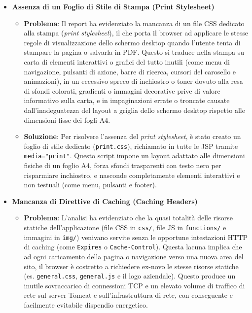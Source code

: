 \begin{itemize}
\begin{itemize}
        \item \textbf{Soluzione}: Per prevenire il download di risorse nascoste, è stato implementato il caricamento differito per le immagini fuori schermo o non immediatamente visibili. Nel carosello, l'attributo \texttt{src} è stato sostituito con \texttt{data-src}, iniettato dinamicamente via JavaScript solo all'attivazione della slide; nella pagina del catalogo, è stato aggiunto l'attributo nativo \texttt{loading="lazy"} sulle immagini dei prodotti, ritardandone il download fino allo scroll effettivo dell'utente.
    \end{itemize}
    \item \textbf{Assenza di un Foglio di Stile di Stampa (Print Stylesheet)}
    \begin{itemize}
        \item \textbf{Problema}: Il report ha evidenziato la mancanza di un file CSS dedicato alla stampa (\textit{print stylesheet}), il che porta il browser ad applicare le stesse regole di visualizzazione dello schermo desktop quando l'utente tenta di stampare la pagina o salvarla in PDF. Questo si traduce nella stampa su carta di elementi interattivi o grafici del tutto inutili (come menu di navigazione, pulsanti di azione, barre di ricerca, cursori del carosello e animazioni), in un eccessivo spreco di inchiostro o toner dovuto alla resa di sfondi colorati, gradienti o immagini decorative prive di valore informativo sulla carta, e in impaginazioni errate o troncate causate dall'inadeguatezza del layout a griglia dello schermo desktop rispetto alle dimensioni fisse dei fogli A4.
        \item \textbf{Soluzione}: Per risolvere l'assenza del \textit{print stylesheet}, è stato creato un foglio di stile dedicato (\texttt{print.css}), richiamato in tutte le JSP tramite \texttt{media="print"}. Questo script impone un layout adattato alle dimensioni fisiche di un foglio A4, forza sfondi trasparenti con testo nero per risparmiare inchiostro, e nasconde completamente elementi interattivi e non testuali (come menu, pulsanti e footer).
    \end{itemize}
    \item \textbf{Mancanza di Direttive di Caching (Caching Headers)}
    \begin{itemize}
        \item \textbf{Problema}: L'analisi ha evidenziato che la quasi totalità delle risorse statiche dell'applicazione (file CSS in \texttt{css/}, file JS in \texttt{functions/} e immagini in \texttt{img/}) venivano servite senza le opportune intestazioni HTTP di caching (come \texttt{Expires} o \texttt{Cache-Control}). Questa lacuna implica che ad ogni caricamento della pagina o navigazione verso una nuova area del sito, il browser è costretto a richiedere ex-novo le stesse risorse statiche (es. \texttt{general.css}, \texttt{general.js} e il logo aziendale). Questo produce un inutile sovraccarico di connessioni TCP e un elevato volume di traffico di rete sul server Tomcat e sull'infrastruttura di rete, con conseguente e facilmente evitabile dispendio energetico.

\end{itemize}
\end{itemize}
